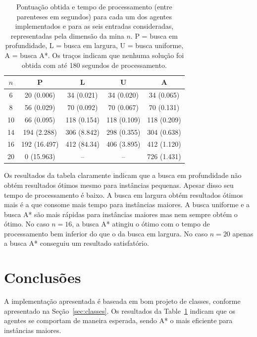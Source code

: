 \documentclass[12pt,a4paper]{article}
\begin{document}
\begin{table}
  \begin{center}
    \begin{tabular}{|c|c|c|c|c|}
      \hline 
      \bf $n$ & \bf P & \bf L & \bf U & \bf A \\
      \hline \hline 
      6 & 20 (0.006) & 34 (0.021) & 34 (0.020) & 34 (0.065) \\ \hline
      8 & 56 (0.029) & 70 (0.092) & 70 (0.067) & 70 (0.131) \\ \hline
      10 & 66 (0.095) & 118 (0.154) & 118 (0.109) & 118 (0.209) \\ \hline
      14 & 194 (2.288) & 306 (8.842) & 298 (0.355) & 304 (0.638) \\ \hline
      16 & 192 (16.497) & 412 (84.34) & 406 (3.895) & 412 (1.120) \\ \hline
      20 & 0 (15.963) & -- & -- & 726 (1.431) \\ \hline
      \end{tabular} 
      \caption{Pontuação obtida e tempo de processamento (entre parenteses em segundos) para cada
      um dos agentes implementados e para as seis entradas consideradas, representadas pela 
      dimensão da mina $n$. P = busca em profundidade, L = busca em largura, U = busca uniforme, 
      A = busca A*. Os traços indicam que nenhuma solução foi obtida com até 180 segundos de 
      processamento.}
      \label{tab:res}
  \end{center}
\end{table}

Os resultados da tabela claramente indicam que a busca em profundidade não obtém resultados ótimos
mesmo para instâncias pequenas. Apesar disso seu tempo de processamento é baixo. A busca em largura
obtém resultados ótimos mais é a que consome mais tempo para instâncias maiores. A busca uniforme 
e a busca A* são mais rápidas para instâncias maiores mas nem sempre obtém o ótimo. 
No caso $n = 16$, a busca A* atingiu o ótimo com o tempo de processamento bem inferior do que o da
busca em largura. No caso $n = 20$ apenas a busca A* conseguiu um resultado satisfatório.


\section{Conclusões}
\label{sec:conc}

A implementação apresentada é baseada em bom projeto de classes, conforme apresentado na 
Seção~\ref{sec:classes}. Os resultados da Table~\ref{tab:res} indicam que os agentes se comportam
de maneira esperada, sendo A* o mais eficiente para instâncias maiores.
\end{document}
